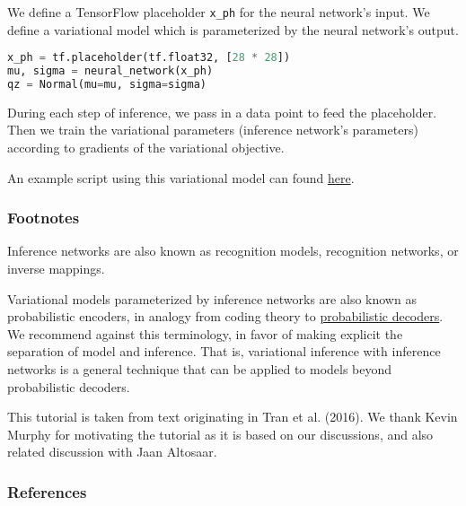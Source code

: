 We define a TensorFlow placeholder \texttt{x_ph} for the neural network's input.
We define a variational model which is parameterized by the neural network's
output.
\begin{lstlisting}[language=Python]
x_ph = tf.placeholder(tf.float32, [28 * 28])
mu, sigma = neural_network(x_ph)
qz = Normal(mu=mu, sigma=sigma)
\end{lstlisting}
During each step of inference, we pass in a data point to feed the
placeholder. Then we train the variational parameters (inference
network's parameters) according to
gradients of the variational objective.

An example script using this variational model can found
\href{https://github.com/blei-lab/edward/blob/master/examples/convolutional_vae.py}
{here}.

\subsubsection{Footnotes}

Inference networks are also known as recognition models, recognition
networks, or inverse mappings.

Variational models parameterized by
inference networks are also known as probabilistic encoders, in
analogy from coding theory to
\href{tut_decoder.html}{probabilistic decoders}.
We recommend against this terminology,
in favor of making explicit the separation of model and inference.
That is,
variational inference with inference networks is a
general technique that can be applied to models beyond
probabilistic decoders.

This tutorial is taken from text originating in Tran et al. (2016).
We thank Kevin Murphy for motivating the tutorial as it is based
on our discussions, and also related discussion with Jaan Altosaar.

\subsubsection{References}\label{references}

